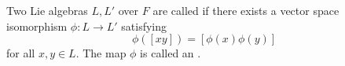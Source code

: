 Two Lie algebras $L, L'$ over $F$ are called  if there exists a vector space isomorphism $\phi: L \rightarrow L'$ satisfying
$$\phi([xy]) = [\phi(x)\phi(y)]$$
for all $x, y \in L$. The map $\phi$ is called an .
